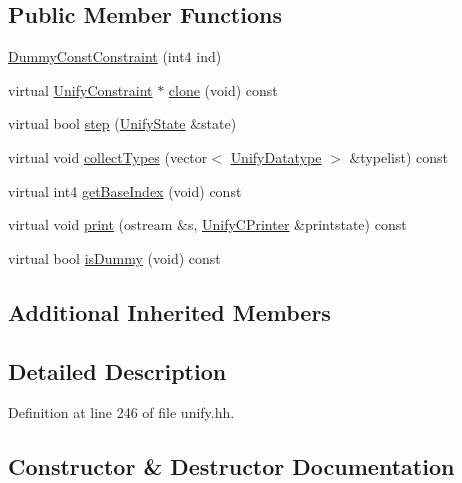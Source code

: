 \subsection*{Public Member Functions}
\begin{DoxyCompactItemize}
\item 
\mbox{\hyperlink{class_dummy_const_constraint_a1a9796613713f8ef62ca22887ea2b337}{Dummy\+Const\+Constraint}} (int4 ind)
\item 
virtual \mbox{\hyperlink{class_unify_constraint}{Unify\+Constraint}} $\ast$ \mbox{\hyperlink{class_dummy_const_constraint_acf3f66f2d189379f19ee11c14278ab3d}{clone}} (void) const
\item 
virtual bool \mbox{\hyperlink{class_dummy_const_constraint_a3c0468211fcda260305a430622872e72}{step}} (\mbox{\hyperlink{class_unify_state}{Unify\+State}} \&state)
\item 
virtual void \mbox{\hyperlink{class_dummy_const_constraint_a2ff9cf3267d687c2f741f3d483b3da58}{collect\+Types}} (vector$<$ \mbox{\hyperlink{class_unify_datatype}{Unify\+Datatype}} $>$ \&typelist) const
\item 
virtual int4 \mbox{\hyperlink{class_dummy_const_constraint_acd0721d4535d7793e10b8ad60b3ab789}{get\+Base\+Index}} (void) const
\item 
virtual void \mbox{\hyperlink{class_dummy_const_constraint_abbe52ab2155b77250b01f52a0c3b3c25}{print}} (ostream \&s, \mbox{\hyperlink{class_unify_c_printer}{Unify\+C\+Printer}} \&printstate) const
\item 
virtual bool \mbox{\hyperlink{class_dummy_const_constraint_a64003bb0a15a9fa35fb634c8c98f8d1e}{is\+Dummy}} (void) const
\end{DoxyCompactItemize}
\subsection*{Additional Inherited Members}


\subsection{Detailed Description}


Definition at line 246 of file unify.\+hh.



\subsection{Constructor \& Destructor Documentation}
\mbox{\label{class_dummy_const_constraint_a1a9796613713f8ef62ca22887ea2b337}} 
